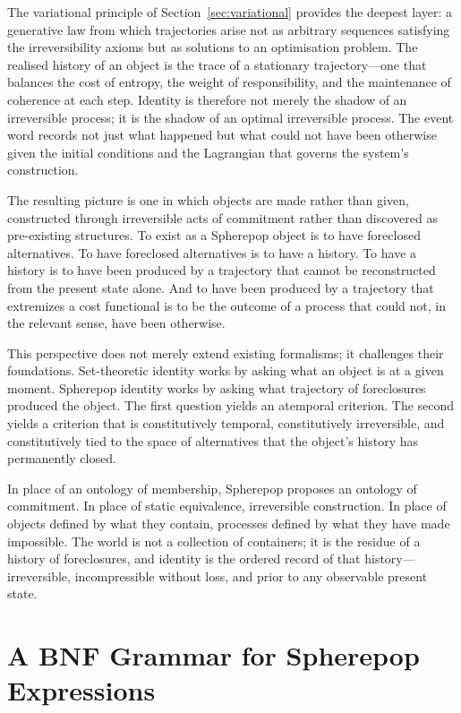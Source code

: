 \documentclass[12pt]{article}
\theoremstyle{plain}
\theoremstyle{definition}
\theoremstyle{remark}
\begin{document}
The variational principle of Section~\ref{sec:variational} provides the deepest
layer: a generative law from which trajectories arise not as arbitrary sequences
satisfying the irreversibility axioms but as solutions to an optimisation problem.
The realised history of an object is the trace of a stationary trajectory---one
that balances the cost of entropy, the weight of responsibility, and the
maintenance of coherence at each step.  Identity is therefore not merely the
shadow of an irreversible process; it is the shadow of an optimal irreversible
process.  The event word records not just what happened but what could not have
been otherwise given the initial conditions and the Lagrangian that governs the
system's construction.

The resulting picture is one in which objects are made rather than given,
constructed through irreversible acts of commitment rather than discovered as
pre-existing structures.  To exist as a Spherepop object is to have foreclosed
alternatives.  To have foreclosed alternatives is to have a history.  To have a
history is to have been produced by a trajectory that cannot be reconstructed
from the present state alone.  And to have been produced by a trajectory that
extremizes a cost functional is to be the outcome of a process that could not,
in the relevant sense, have been otherwise.

This perspective does not merely extend existing formalisms; it challenges their
foundations.  Set-theoretic identity works by asking what an object is at a
given moment.  Spherepop identity works by asking what trajectory of foreclosures
produced the object.  The first question yields an atemporal criterion.  The
second yields a criterion that is constitutively temporal, constitutively
irreversible, and constitutively tied to the space of alternatives that the
object's history has permanently closed.

In place of an ontology of membership, Spherepop proposes an ontology of
commitment.  In place of static equivalence, irreversible construction.  In
place of objects defined by what they contain, processes defined by what they
have made impossible.  The world is not a collection of containers; it is the
residue of a history of foreclosures, and identity is the ordered record of
that history---irreversible, incompressible without loss, and prior to any
observable present state.
\section{A BNF Grammar for Spherepop Expressions}
\label{app:grammar}
\end{document}
